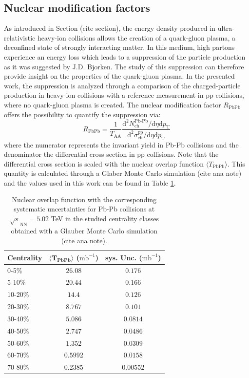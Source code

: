 \documentclass[12pt,a4paper]{report}
\begin{document}
\subsection{Nuclear modification factors}
As introduced in Section (cite section), the energy density produced in ultra-relativistic heavy-ion collisions  allows the creation of a quark-gluon plasma, a deconfined state of strongly interacting matter. In this medium, high \pt partons experience an energy loss which leads to a suppression of the particle production as it was suggested by J.D. Bjorken. The study of this suppression can therefore provide insight on the properties of the quark-gluon plasma. In the presented work, the suppression is analyzed through a comparison of the charged-particle production in heavy-ion collisions with a reference measurement in pp collisions, where no quark-gluon plasma is created. The nuclear modification factor $R_\text{PbPb} $ offers the possibility to quantify the suppression via:
\begin{equation}
R_\text{PbPb} = \dfrac{1}{T_\text{AA}} \dfrac{\text{d}^2 N^\text{Pb-Pb}_\text{ch} / \text{d}\eta \text{d}p_\text{T}}{\text{d}^2 \sigma^\text{pp}_\text{ch} / \text{d}\eta \text{d}p_\text{T}}
\end{equation}
where the numerator represents the invariant yield in Pb-Pb collisions and the denominator the differential cross section in pp collisions. Note that the differential cross section is scaled with the nuclear overlap function $\langle T_\text{PbPb} \rangle$. This quantity is calculated through a Glaber Monte Carlo simulation (cite ana note) and the values used in this work can be found in Table \ref{tab:taa}.\\
\begin{table}[tb!]
\renewcommand{\arraystretch}{1.5}
\centering
\begin{tabular}{l c c}
\toprule
\rowcolor{headerBlue}  \textbf{Centrality} &  \textbf{$\mathbf{\langle T_\text{PbPb} \rangle}$ ($\text{mb}^{-1}$)}  &   \textbf{sys. Unc. } ($\text{mb}^{-1}$) \\
\midrule
\midrule
0-5\% & $26.08$  & $0.176$\\
5-10\% & $20.44$ & $0.166$\\
10-20\% & $14.4$ & $0.126$ \\
20-30\% & $8.767$ & $0.101$ \\
30-40\% & $5.086$ & $0.0814$ \\
40-50\% & $2.747$ & $0.0486$\\
50-60\% & $1.352$ & $0.0309$\\
60-70\% & $0.5992$ & $0.0158$\\
70-80\% & $0.2385$ & $0.00552$ \\
\bottomrule
\end{tabular}
\caption{Nuclear overlap function with the corresponding systematic uncertainties for Pb-Pb collisions at $\sqrt{s}_\text{NN}=5.02$ TeV in the studied centrality classes obtained with a Glauber Monte Carlo simulation (cite ana note).}
\label{tab:taa}
\end{table}
\end{document}
